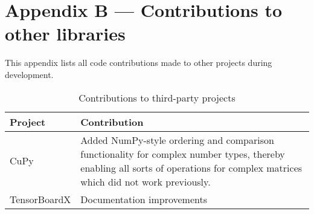 \chapter{Appendix B --- Contributions to other libraries}\label{ch:appendixB}

This appendix lists all code contributions made to other projects during
development.

\begin{table}
    \centering
    \caption{Contributions to third-party projects}
    \label{tbl:pull}
    \begin{tabularx}{\textwidth}{lX}
        \toprule
        Project      & Contribution \tabularnewline
        \midrule
        CuPy         & Added NumPy-style ordering and comparison functionality for complex number types, thereby enabling all sorts of operations for complex matrices which did not work previously. \tabularnewline
        TensorBoardX & Documentation improvements \tabularnewline
        \bottomrule
    \end{tabularx}
\end{table}

